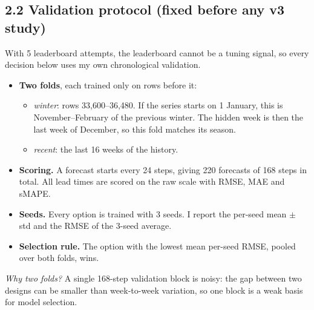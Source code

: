 \subsection*{2.2 Validation protocol (fixed before any v3 study)}
With 5 leaderboard attempts, the leaderboard cannot be a tuning signal, so every decision below uses my own chronological validation.
\begin{itemize}
\item \textbf{Two folds}, each trained only on rows before it:
  \begin{itemize}
  \item \emph{winter}: rows 33,600--36,480. If the series starts on 1 January, this is November--February of the previous winter. The hidden week is then the last week of December, so this fold matches its season.
  \item \emph{recent}: the last 16 weeks of the history.
  \end{itemize}
\item \textbf{Scoring.} A forecast starts every 24 steps, giving 220 forecasts of 168 steps in total. All lead times are scored on the raw scale with RMSE, MAE and sMAPE.
\item \textbf{Seeds.} Every option is trained with 3 seeds. I report the per-seed mean $\pm$ std and the RMSE of the 3-seed average.
\item \textbf{Selection rule.} The option with the lowest mean per-seed RMSE, pooled over both folds, wins.
\end{itemize}
\emph{Why two folds?} A single 168-step validation block is noisy: the gap between two designs can be smaller than week-to-week variation, so one block is a weak basis for model selection.

